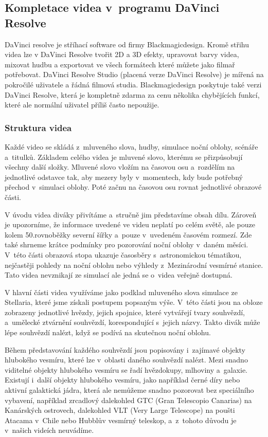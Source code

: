 \documentclass[12pt,a4paper,titlepage]{article}
\begin{document}
\subsection{Kompletace videa v~programu DaVinci Resolve}\label{makingof:resolve}
DaVinci resolve je stříhací software od firmy Blackmagicdesign. Kromě střihu videa lze v DaVinci Resolve tvořit 2D a 3D efekty, upravovat barvy videa, mixovat hudbu a exportovat ve všech formátech které můžete jako filmař potřebovat. DaVinci Resolve Studio (placená verze DaVinci Resolve) je mířená na pokročilé uživatele a řádná filmová studia. Blackmagicdesign poskytuje také verzi DaVinci Resolve, která je kompletně zdarma za cenu několika chybějících funkcí, které ale normální uživatel příliš často nepoužije.

\subsubsection{Struktura videa}\label{makingof:resolve:structure}
Každé video se skládá z~mluveného slova, hudby, simulace noční oblohy, scénáře a~titulků. Základem celého videa je mluvené slovo, kterému se přizpůsobují všechny další složky. Mluvené slovo vložím na časovou osu a~rozdělím na jednotlivé odstavce tak, aby mezery byly v~momentech, kdy bude potřebný přechod v~simulaci oblohy. Poté začnu na časovou osu rovnat jednotlivé obrazové části.

V úvodu videa diváky přivítáme a~stručně jim představíme obsah dílu. Zároveň je upozorníme, že informace uvedené ve videu neplatí po celém světě, ale pouze kolem 50.\@ rovnoběžky severní šířky a~pouze v~uvedeném časovém rozmezí. Zde také shrneme krátce podmínky pro pozorování noční oblohy v~daném měsíci. V~této části obrazová stopa ukazuje časosběry s~astronomickou tématikou, nejčastěji pohledy na noční oblohu nebo výhledy z~Mezinárodní vesmírné stanice. Tato videa nevznikají ze simulací ale jedná se o~videa veřejně dostupná.

V hlavní části videa využíváme jako podklad mluveného slova simulace ze Stellaria, které jsme získali postupem popsaným výše. V~této části jsou na obloze zobrazeny jednotlivé hvězdy, jejich spojnice, které vytvářejí tvary souhvězdí, a~umělecké ztvárnění souhvězdí, korespondující s~jejich názvy. Takto divák může lépe souhvězdí nalézt, když se podívá na skutečnou noční oblohu. 

Během představování každého souhvězdí jsou popisovány i~zajímavé objekty hlubokého vesmíru, které lze v~oblasti daného souhvězdí nalézt. Mezi snadno viditelné objekty hlubokého vesmíru se řadí hvězdokupy, mlhoviny a~galaxie. Existují i~další objekty hlubokého vesmíru, jako například černé díry nebo aktivní galaktická jádra, která ale nemůžeme snadno pozorovat bez speciálního vybavení, například zrcadlový dalekohled GTC (Gran Telescopio Canarias) na Kanárských ostrovech, dalekohled VLT (Very Large Telescope) na poušti Atacama v~Chile nebo Hubblův vesmírný teleskop, a~z~tohoto důvodu je v~našich videích neuvádíme.
\end{document}

